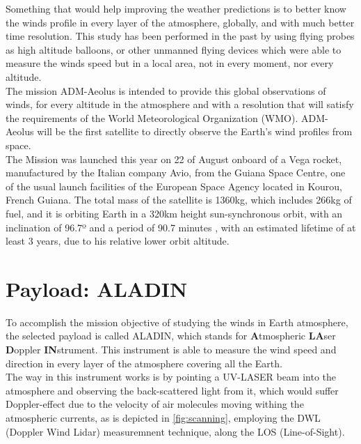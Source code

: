 Something that would help improving the weather predictions is to better know
the winds profile in every layer of the atmosphere, globally, and with much better
time resolution. This study has been performed in the past by using flying probes
as high altitude balloons, or other unmanned flying devices which were able to
measure the winds speed but in a local area, not in every moment, nor every altitude.\\

The mission ADM-Aeolus is intended to provide this global observations of winds,
for every altitude in the atmosphere and with a resolution that will satisfy the
requirements of the World Meteorological Organization (WMO). ADM-Aeolus will
be the first satellite to directly observe the Earth’s wind profiles from space.
\cite{Endemann2004}\\

The Mission was launched this year on 22 of August onboard of a Vega rocket, manufactured
by the Italian company Avio, from the Guiana Space Centre, one of the usual launch
facilities of the European Space Agency located in Kourou, French Guiana. The total
mass of the satellite is 1360kg, which includes 266kg of fuel, and it is orbiting
Earth in a 320km height sun-synchronous orbit, with an inclination of 96.7º and a period
of 90.7 minutes \cite{aeolus_n2yo.com}, with an estimated lifetime of at least
3 years, due to his relative lower orbit altitude.

\section{Payload: ALADIN}

To accomplish the mission objective of studying the winds in Earth atmosphere, the
selected payload is called ALADIN, which stands for \textbf{A}tmospheric \textbf{LA}ser
\textbf{D}oppler \textbf{IN}strument. This instrument is able to measure the
wind speed and direction in every layer of the atmosphere covering all the Earth.\\

The way in this instrument works is by pointing a UV-LASER beam into the atmosphere
and observing the back-scattered light from it, which would suffer Doppler-effect
due to the velocity of air molecules moving withing the atmospheric currents, as
is depicted in \ref{fig:scanning}, employing the DWL (Doppler Wind Lidar) measuremnent
technique, along the LOS (Line-of-Sight).\\

